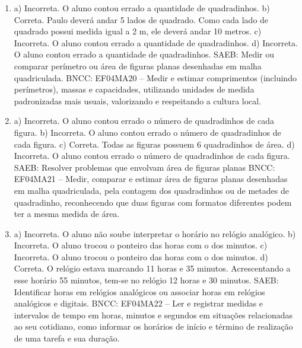 \begin{enumerate}
\item
a) Incorreta. O aluno contou errado a quantidade de quadradinhos.
b) Correta. Paulo deverá andar 5 lados de quadrado. Como cada lado de quadrado possui medida igual a 2 m, ele deverá andar 10 metros.
c) Incorreta. O aluno contou errado a quantidade de quadradinhos.
d) Incorreta. O aluno contou errado a quantidade de quadradinhos.
SAEB: Medir ou comparar perímetro ou área de figuras planas desenhadas em malha quadriculada.
BNCC: EF04MA20 -- Medir e estimar comprimentos (incluindo perímetros), massas e capacidades, utilizando
unidades de medida padronizadas mais usuais, valorizando e respeitando a cultura local.

\item
a) Incorreta. O aluno contou errado o número de quadradinhos de cada figura.
b) Incorreta. O aluno contou errado o número de quadradinhos de cada figura.
c) Correta. Todas as figuras possuem 6 quadradinhos de área.
d) Incorreta. O aluno contou errado o número de quadradinhos de cada figura.
SAEB: Resolver problemas que envolvam área de figuras planas
BNCC: EF04MA21 -- Medir, comparar e estimar área de figuras planas desenhadas em malha quadriculada,
pela contagem dos quadradinhos ou de metades de quadradinho, reconhecendo que duas figuras
com formatos diferentes podem ter a mesma medida de área.

\item
a) Incorreta. O aluno não soube interpretar o horário no relógio analógico.
b) Incorreta. O aluno trocou o ponteiro das horas com o dos minutos.
c) Incorreta. O aluno trocou o ponteiro das horas com o dos minutos.
d) Correta. O relógio estava marcando 11 horas e 35 minutos. Acrescentando a esse horário 55 minutos, tem-se no relógio 12 horas e 30 minutos.
SAEB: Identificar horas em relógios analógicos ou associar horas em relógios analógicos e digitais.
BNCC: EF04MA22 -- Ler e registrar medidas e intervalos de tempo em horas, minutos e segundos em
situações relacionadas ao seu cotidiano, como informar os horários de início e término de realização
de uma tarefa e sua duração.
\end{enumerate}



